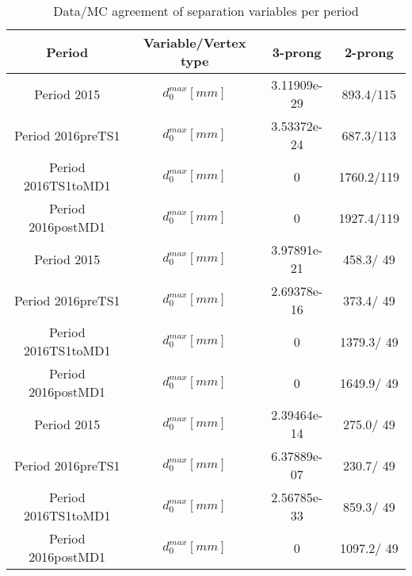 \documentclass{article}
\begin{document}
\begin{longtable}{c|c|c|c}
\caption{\label{tab:sepVarsandSepPeriods}Data/MC agreement of separation variables per period}\\
Period & Variable/Vertex type & 3-prong & 2-prong\\
\hline
 Period 2015 & $d_{0}^{max} [mm]$ & 3.11909e-29 & 893.4/115\\
\hline
 Period 2016preTS1 & $d_{0}^{max} [mm]$ & 3.53372e-24 & 687.3/113\\
\hline
 Period 2016TS1toMD1 & $d_{0}^{max} [mm]$ & 0 & 1760.2/119\\
\hline
 Period 2016postMD1 & $d_{0}^{max} [mm]$ & 0 & 1927.4/119\\
\hline
 Period 2015 & $d_{0}^{max} [mm]$ & 3.97891e-21 & 458.3/ 49\\
\hline
 Period 2016preTS1 & $d_{0}^{max} [mm]$ & 2.69378e-16 & 373.4/ 49\\
\hline
 Period 2016TS1toMD1 & $d_{0}^{max} [mm]$ & 0 & 1379.3/ 49\\
\hline
 Period 2016postMD1 & $d_{0}^{max} [mm]$ & 0 & 1649.9/ 49\\
\hline
 Period 2015 & $d_{0}^{max} [mm]$ & 2.39464e-14 & 275.0/ 49\\
\hline
 Period 2016preTS1 & $d_{0}^{max} [mm]$ & 6.37889e-07 & 230.7/ 49\\
\hline
 Period 2016TS1toMD1 & $d_{0}^{max} [mm]$ & 2.56785e-33 & 859.3/ 49\\
\hline
 Period 2016postMD1 & $d_{0}^{max} [mm]$ & 0 & 1097.2/ 49\\
\hline
\end{longtable}
\end{document}
